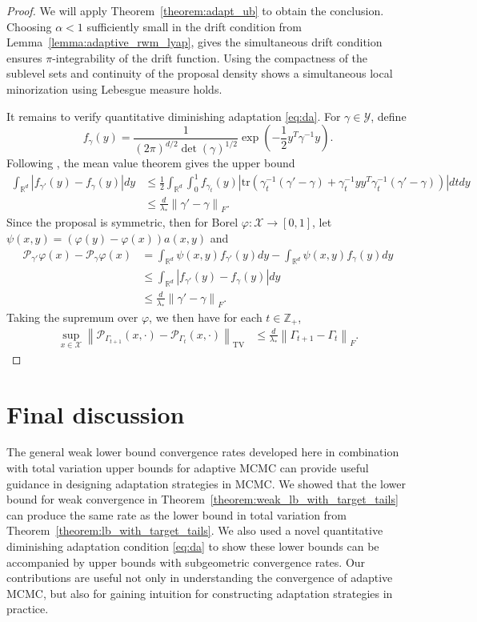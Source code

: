 \documentclass[12pt]{article}
\theoremstyle{plain}
\theoremstyle{remark}
\newcommand{\norm}[1]{\left\lVert#1\right\rVert}
\newcommand{\tr}{\text{tr}}
\newcommand{\R}{\mathbb{R}}
\newcommand{\Z}{\mathbb{Z}}
\renewcommand{\P}{\mathcal{P}}
\newcommand{\X}{\mathcal{X}}
\newcommand{\Y}{\mathcal{Y}}
\let\temp\phi
\let\phi\varphi
\let\varphi\temp
\newcommand{\eq}[1]{\begin{align*}#1\end{align*}}
\begin{document}
\begin{proof}
We will apply Theorem~\ref{theorem:adapt_ub} to obtain the conclusion.
Choosing $\alpha < 1$ sufficiently small in the drift condition from Lemma~\ref{lemma:adaptive_rwm_lyap}, gives the simultaneous drift condition ensures $\pi$-integrability of the drift function.
Using the compactness of the sublevel sets and continuity of the proposal density shows a simultaneous local minorization using Lebesgue measure holds.

It remains to verify quantitative diminishing adaptation \eqref{eq:da}.
For $\gamma \in \Y$, define 
\[
f_{\gamma}(y) = \frac{1}{(2\pi)^{d/2} \det(\gamma )^{1/2} } \exp\left( - \frac{1}{2} y^T {\gamma}^{-1} y \right).
\]
Following \citep[Lemma 13]{andrieu:moulines:2006}, the mean value theorem gives the upper bound
\begin{align*}
\int_{\R^d} \left| f_{\gamma'}(y) - f_{\gamma}(y)
\right| dy
&\le \frac{1}{2} \int_{\R^d} \int_0^1 f_{\gamma_t}(y) \left| \tr\left( \gamma_t^{-1} (\gamma' - \gamma)  + \gamma_t^{-1} y y^T \gamma_t^{-1} ( \gamma' - \gamma ) \right) \right| dt dy
\\
&\le \frac{d}{\lambda_*} \norm{\gamma' - \gamma}_F.
\end{align*}
Since the proposal is symmetric, then for Borel $\phi : \X \to [0, 1]$, let $\psi(x, y) = ( \phi(y) - \phi(x)) a(x, y)$ and
\eq{
\P_{\gamma'} \phi(x) - \P_{\gamma} \phi(x)
&= \int_{\R^d} \psi(x, y) f_{\gamma'}(y) dy - \int_{\R^d} \psi(x, y) f_{\gamma}(y)  dy
\\
&\le \int_{\R^d} \left| f_{\gamma'}(y) - f_{\gamma}(y)
\right| dy
\\
&\le \frac{d}{\lambda_*}  \norm{\gamma' - \gamma}_F.
}
Taking the supremum over $\phi$, we then have for each $t \in \Z_+$,
\eq{
\sup_{x \in \X} \norm{ \P_{\Gamma_{t + 1}}(x, \cdot) - \P_{\Gamma_t}(x, \cdot) }_{\text{TV}}
&\le \frac{d}{\lambda_*} \norm{ \Gamma_{t + 1} - \Gamma_t }_F.
}
\end{proof}

\section{Final discussion}
\label{section:conclusion}

The general weak lower bound convergence rates developed here in combination with total variation upper bounds for adaptive MCMC can provide useful guidance in designing adaptation strategies in MCMC.
We showed that the lower bound for weak convergence in Theorem~\ref{theorem:weak_lb_with_target_tails} can produce the same rate as the lower bound in total variation from Theorem~\ref{theorem:lb_with_target_tails}.
We also used a novel quantitative diminishing adaptation condition \eqref{eq:da} to show these lower bounds can be accompanied by upper bounds with subgeometric convergence rates.
Our contributions are useful not only in understanding the convergence of adaptive MCMC, but also for gaining intuition for constructing adaptation strategies in practice.
\end{document}
